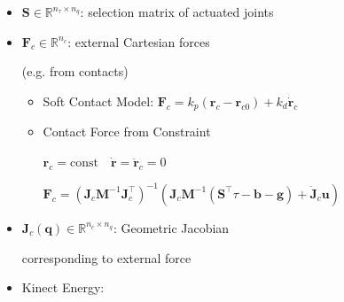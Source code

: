 \documentclass[landscape,a0paper,fontscale=0.285]{baposter} %
\newcommand{\compresslist}{ %
\setlength{\itemsep}{1pt}
\setlength{\parskip}{0pt}
\setlength{\parsep}{0pt}
}
\begin{document}
\begin{poster}
{\begin{minipage}[c]{0.475\textwidth}
\begin{itemize}
    $\tau = \sum_{k=1}^{n_A} \tau_{a,k}\tau_{ext}$
      \begin{itemize}[label=$\circ$]\compresslist
        \item actuator generalized force 
        
        \hspace{-12pt}$\tau_{a,k} = (\mathbf{J}_{S_k} - \mathbf{J}_{S_{k-1}})^\top\mathbf{F}_{a,k} + (\mathbf{J}_{R_k} - \mathbf{J}_{R_{k-1}})^\top \mathbf{T}_{a,k}$
        
        $\mathbf{T}$ is torque here
        \item external generalized force 
        
        \hspace{-12pt}$\tau_{ext} = \sum_{j=1}^{n_{f,ext}}\mathbf{J}_{P,j}^\top \mathbf{F}_j + \sum_{j=1}^{n_{m,ext}}\mathbf{J}_{R,j}^\top\mathbf{T}_{ext, j}$
      \end{itemize}
    \item $\mathbf{S}\in \mathbb{R}^{n_\tau\times n_q}$: selection matrix of actuated joints
 
\end{itemize}
\end{minipage}
\hfill
\begin{minipage}[c]{0.475\textwidth}
    \begin{itemize}\compresslist
           \item $\mathbf{F}_c\in \mathbb{R}^{n_c}$: external Cartesian forces 
    
    (e.g. from contacts)
      \begin{itemize}[label=$\circ$]\compresslist
        \item Soft Contact Model: $\mathbf{F}_c = k_p(\mathbf{r}_c - \mathbf{r}_{c0}) + k_d\dot{\mathbf{r}}_c$
        \item Contact Force from Constraint
        
        $\mathbf{r}_c = \text{const}\quad\dot{\mathbf{r}}=\ddot{\mathbf{r}}_c=0$
        
        \hspace{-20pt}$\mathbf{F}_c = (\mathbf{J}_c\mathbf{M}^{-1}\mathbf{J}_c^\top)^{-1}\left(\mathbf{J}_c\mathbf{M}^{-1}(\mathbf{S}^{\top}\tau-\mathbf{b}-\mathbf{g})+\dot{\mathbf{J}}_c\mathbf{u}\right)$
      \end{itemize}
    \item $\mathbf{J}_c(\mathbf{q})\in \mathbb{R}^{n_c\times n_q}$: Geometric Jacobian 
    
    corresponding to external force
    \item Kinect Energy: 
    

\end{itemize}
\end{minipage}}
\end{poster}
\end{document}
